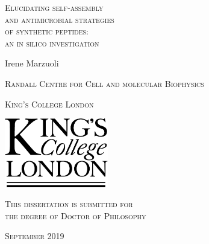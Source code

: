 


\thispagestyle{empty}

\begin{center}


{\textsc {\Huge Elucidating self-assembly}}\\
%
\vspace{.15in}
%
{\textsc {\Huge and antimicrobial strategies}}\\
%
\vspace{.15in}
%
{\textsc {\Huge of synthetic peptides:}}\\
%
\vspace{.15in}
%
{\textsc {\Huge an in silico investigation}}
%
\vspace{1.5in}

{\Large Irene Marzuoli}

\vspace{.4in}

{\textsc {\large Randall Centre for Cell and molecular Biophysics}}

\vspace{0.15in}

{\textsc {\large King's College London}}

\vspace{1in}
\includegraphics[height=3cm]{KCL_logo.pdf}

\vspace{1in}

{\textsc {\large This dissertation is submitted for \\ 
the degree of Doctor of Philosophy}}

\vspace{0.5in}

{\textsc {\large September 2019}}

\end{center}

